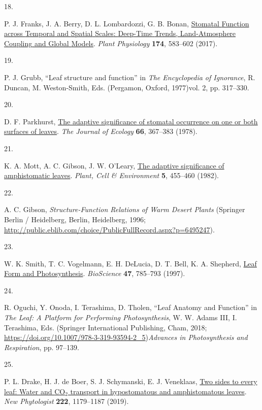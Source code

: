 \documentclass[
  letterpaper,
  DIV=11,
  numbers=noendperiod]{scrartcl}
\newlength{\cslhangindent}
\newlength{\csllabelwidth}
\newenvironment{CSLReferences}[2] %
 {\begin{list}{}{%
  \setlength{\itemindent}{0pt}
  \setlength{\leftmargin}{0pt}
  \setlength{\parsep}{0pt}
  \ifodd #1
   \setlength{\leftmargin}{\cslhangindent}
   \setlength{\itemindent}{-1\cslhangindent}
  \fi
  \setlength{\itemsep}{#2\baselineskip}}}
 {\end{list}}
\newcommand{\CSLLeftMargin}[1]{\parbox[t]{\csllabelwidth}{\strut#1\strut}}
\newcommand{\CSLRightInline}[1]{\parbox[t]{\linewidth - \csllabelwidth}{\strut#1\strut}}
\begin{document}
\begin{CSLReferences}{0}{1}
\CSLLeftMargin{18. }%
\CSLRightInline{P. J. Franks, J. A. Berry, D. L. Lombardozzi, G. B.
Bonan, \href{https://doi.org/10.1104/pp.17.00287}{Stomatal {Function}
across {Temporal} and {Spatial} {Scales}: {Deep}-{Time} {Trends},
{Land}-{Atmosphere} {Coupling} and {Global} {Models}}. \emph{Plant
Physiology} \textbf{174}, 583--602 (2017).}

\CSLLeftMargin{19. }%
\CSLRightInline{P. J. Grubb, {``Leaf structure and function''} in
\emph{The Encyclopedia of Ignorance}, R. Duncan, M. Weston-Smith, Eds.
(Pergamon, Oxford, 1977)vol. 2, pp. 317--330.}

\CSLLeftMargin{20. }%
\CSLRightInline{D. F. Parkhurst,
\href{https://doi.org/10.2307/2259142}{The adaptive significance of
stomatal occurrence on one or both surfaces of leaves}. \emph{The
Journal of Ecology} \textbf{66}, 367--383 (1978).}

\CSLLeftMargin{21. }%
\CSLRightInline{K. A. Mott, A. C. Gibson, J. W. O'Leary,
\href{https://doi.org/10.1111/1365-3040.ep11611750}{The adaptive
significance of amphistomatic leaves}. \emph{Plant, Cell \& Environment}
\textbf{5}, 455--460 (1982).}

\CSLLeftMargin{22. }%
\CSLRightInline{A. C. Gibson, \emph{Structure-{Function} {Relations} of
{Warm} {Desert} {Plants}} (Springer Berlin / Heidelberg, Berlin,
Heidelberg, 1996;
\url{http://public.eblib.com/choice/PublicFullRecord.aspx?p=6495247}).}

\CSLLeftMargin{23. }%
\CSLRightInline{W. K. Smith, T. C. Vogelmann, E. H. DeLucia, D. T. Bell,
K. A. Shepherd, \href{https://doi.org/10.2307/1313100}{Leaf {Form} and
{Photosynthesis}}. \emph{BioScience} \textbf{47}, 785--793 (1997).}

\CSLLeftMargin{24. }%
\CSLRightInline{R. Oguchi, Y. Onoda, I. Terashima, D. Tholen, {``Leaf
{Anatomy} and {Function}''} in \emph{The {Leaf}: {A} {Platform} for
{Performing} {Photosynthesis}}, W. W. Adams III, I. Terashima, Eds.
(Springer International Publishing, Cham, 2018;
\url{https://doi.org/10.1007/978-3-319-93594-2_5})\emph{Advances in
{Photosynthesis} and {Respiration}}, pp. 97--139.}

\CSLLeftMargin{25. }%
\CSLRightInline{P. L. Drake, H. J. de Boer, S. J. Schymanski, E. J.
Veneklaas, \href{https://doi.org/10.1111/nph.15652}{Two sides to every
leaf: Water and {CO}\(_{\textrm{2}}\) transport in hypostomatous and
amphistomatous leaves}. \emph{New Phytologist} \textbf{222}, 1179--1187
(2019).}


\end{CSLReferences}
\end{document}
